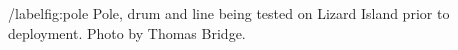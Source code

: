 /label{fig:pole} Pole, drum and line being tested on Lizard Island prior to deployment. Photo by Thomas Bridge.
    